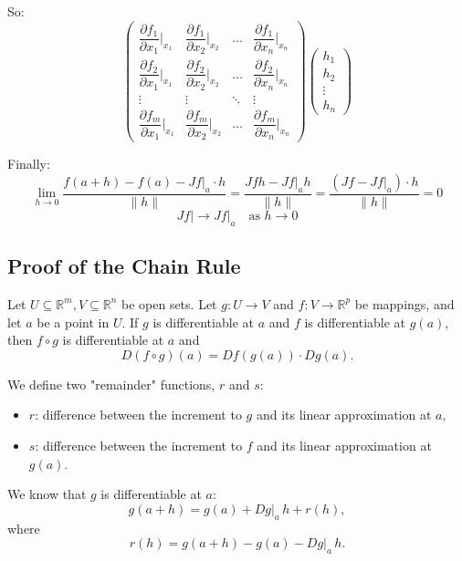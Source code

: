 \documentclass[11pt]{article}
\begin{document}
So:
\[
\begin{pmatrix}
    \dfrac{\partial f_1}{\partial x_1} \big|_{x_1} & \dfrac{\partial f_1}{\partial x_2} \big|_{x_2} & \ldots & \dfrac{\partial f_1}{\partial x_n} \big|_{x_n} \\
    \dfrac{\partial f_2}{\partial x_1} \big|_{x_1} & \dfrac{\partial f_2}{\partial x_2} \big|_{x_2} & \ldots & \dfrac{\partial f_2}{\partial x_n} \big|_{x_n} \\
    \vdots & \vdots & \ddots & \vdots \\
    \dfrac{\partial f_m}{\partial x_1} \big|_{x_1} & \dfrac{\partial f_m}{\partial x_2} \big|_{x_2} & \ldots & \dfrac{\partial f_m}{\partial x_n} \big|_{x_n}
\end{pmatrix} \begin{pmatrix}
    h_1 \\
    h_2 \\
    \vdots \\
    h_n
\end{pmatrix}
\]

Finally:
\[
\lim_{h \to 0} \frac{f(a + h) - f(a) - Jf \big|_a \cdot h}{\| h \|} = \frac{Jf h - Jf \big|_a h}{\| h \|} = \frac{(Jf - Jf \big|_a) \cdot h}{\| h \|} = 0
\]
\[
Jf \big| \to Jf \big|_a \quad \text{as } h \to 0
\]

\subsection{Proof of the Chain Rule}

Let \( U \subseteq \mathbb{R}^m, V \subseteq \mathbb{R}^n \) be open sets. Let \( g: U \to V \) and \( f: V \to \mathbb{R}^p \) be mappings, and let \( a \) be a point in \( U \). If \( g \) is differentiable at \( a \) and \( f \) is differentiable at \( g(a) \), then \( f \circ g \) is differentiable at \( a \) and
\[
D(f \circ g)(a) = Df(g(a)) \cdot Dg(a).
\]

We define two "remainder" functions, \( r \) and \( s \):
\begin{itemize}
    \item \( r \): difference between the increment to \( g \) and its linear approximation at \( a \),
    \item \( s \): difference between the increment to \( f \) and its linear approximation at \( g(a) \).
\end{itemize}

We know that \( g \) is differentiable at \( a \):
\[
g(a+h) = g(a) + Dg|_a \, h + r(h),
\]
where
\[
r(h) = g(a+h) - g(a) - Dg|_a \, h.
\]
\end{document}
